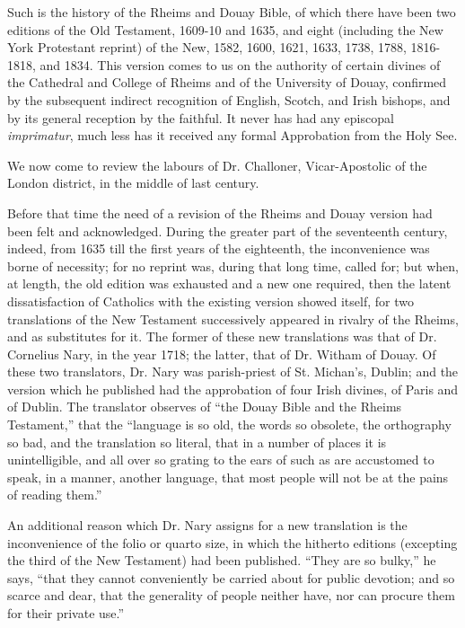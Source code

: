 Such is the history of the Rheims and Douay Bible, of which there
have been two editions of the Old Testament, 1609-10 and 1635, and
eight (including the New York Protestant reprint) of the New, 1582,
1600, 1621, 1633, 1738, 1788, 1816-1818, and 1834. This version comes
to us on the authority of certain divines of the Cathedral and College
of Rheims and of the University of Douay, confirmed by the subsequent
indirect recognition of English, Scotch, and Irish bishops, and by its
general reception by the faithful. It never has had any episcopal \emph{imprimatur},
much less has it received any formal Approbation from the Holy See.


We now come to review the labours of Dr. Challoner, Vicar-Apostolic
of the London district, in the middle of last century.

Before that time the need of a revision of the Rheims and Douay
version had been felt and acknowledged. During the greater part of the
seventeenth century, indeed, from 1635 till the first years of the
eighteenth, the inconvenience was borne of necessity; for no reprint
was, during that long time, called for; but when, at length, the old
edition was exhausted and a new one required, then the latent
dissatisfaction of Catholics with the existing version showed
itself, for two translations of the New Testament successively
appeared in rivalry of the Rheims, and as substitutes for it. The
former of these new translations was that of Dr. Cornelius Nary, in
the year 1718; the latter, that of Dr. Witham of Douay. Of these two
translators, Dr. Nary was parish-priest of St. Michan's, Dublin; and
the version which he published had the approbation of four Irish
divines, of Paris and of Dublin. The translator observes of ``the
Douay Bible and the Rheims Testament,'' that the ``language is
so old, the words so obsolete, the orthography so bad, and the
translation so literal, that in a number of places it is
unintelligible, and all over so grating to the ears of such as are
accustomed to speak, in a manner, another language, that most people
will not be at the pains of reading them.''

An additional reason which Dr. Nary assigns for a new translation
is the inconvenience of the folio or quarto size, in which the
hitherto editions (excepting the third of the New Testament) had been
published. ``They are so bulky,'' he says, ``that they
cannot conveniently be carried about for public devotion; and so
scarce and dear, that the generality of people neither have, nor can
procure them for their private use.''


